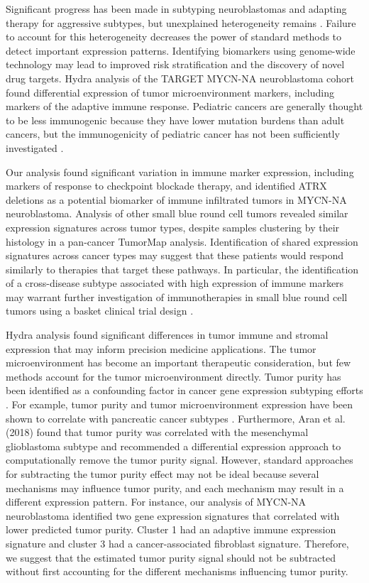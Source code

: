 \documentclass[10pt,letterpaper]{article}
\begin{document}
Significant progress has been made in subtyping neuroblastomas and adapting therapy for aggressive subtypes, but unexplained heterogeneity remains \cite{morgensternChallengeDefiningUltrahighrisk2019}. Failure to account for this heterogeneity decreases the power of standard methods to detect important expression patterns. Identifying biomarkers using genome-wide technology may lead to improved risk stratification and the discovery of novel drug targets. Hydra analysis of the TARGET MYCN-NA neuroblastoma cohort found differential expression of tumor microenvironment markers, including markers of the adaptive immune response. Pediatric cancers are generally thought to be less immunogenic because they have lower mutation burdens than adult cancers, but the immunogenicity of pediatric cancer has not been sufficiently investigated \cite{majzner2017harnessing, zamoraPediatricPatientsAcute2019}.

Our analysis found significant variation in immune marker expression, including markers of response to checkpoint blockade therapy, and identified ATRX deletions as a potential biomarker of immune infiltrated tumors in MYCN-NA neuroblastoma. Analysis of other small blue round cell tumors revealed similar expression signatures across tumor types, despite samples clustering by their histology in a pan-cancer TumorMap analysis. Identification of shared expression signatures across cancer types may suggest that these patients would respond similarly to therapies that target these pathways. In particular, the identification of a cross-disease subtype associated with high expression of immune markers may warrant further investigation of immunotherapies in small blue round cell tumors using a basket clinical trial design \cite{cunananEfficientBasketTrial2017}.

Hydra analysis found significant differences in tumor immune and stromal expression that may inform precision medicine applications. The tumor microenvironment has become an important therapeutic consideration, but few methods account for the tumor microenvironment directly. Tumor purity has been identified as a confounding factor in cancer gene expression subtyping efforts \cite{rheeImpactTumorPurity2018}. For example, tumor purity and tumor microenvironment expression have been shown to correlate with pancreatic cancer subtypes \cite{raphael2017integrated}. Furthermore, Aran et al. (2018) found that tumor purity was correlated with the mesenchymal glioblastoma subtype and recommended a differential expression approach to computationally remove the tumor purity signal. However, standard approaches for subtracting the tumor purity effect may not be ideal because several mechanisms may influence tumor purity, and each mechanism may result in a different expression pattern. For instance, our analysis of MYCN-NA neuroblastoma identified two gene expression signatures that correlated with lower predicted tumor purity. Cluster 1 had an adaptive immune expression signature and cluster 3 had a cancer-associated fibroblast signature. Therefore, we suggest that the estimated tumor purity signal should not be subtracted without first accounting for the different mechanisms influencing tumor purity.
\end{document}

